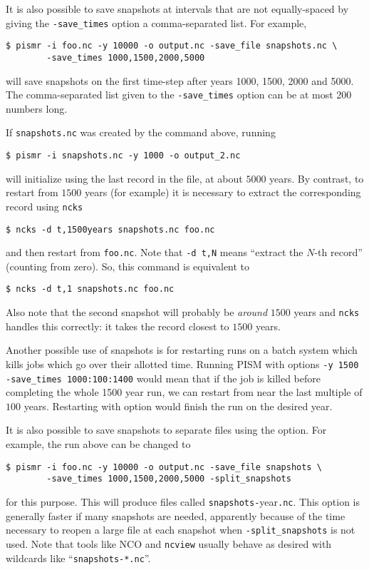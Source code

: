 It is also possible to save snapshots at intervals that are not equally-spaced
by giving the \verb|-save_times| option a comma-separated list. For example,
\begin{verbatim}
$ pismr -i foo.nc -y 10000 -o output.nc -save_file snapshots.nc \
        -save_times 1000,1500,2000,5000
\end{verbatim}
will save snapshots on the first time-step after years 1000, 1500, 2000 and 5000.
The comma-separated list given to the \verb|-save_times| option can be at most 200 numbers long.

If \verb|snapshots.nc| was created by the command above, running
\begin{verbatim}
$ pismr -i snapshots.nc -y 1000 -o output_2.nc
\end{verbatim}
will initialize using the last record in the file, at about $5000$ years.  By contrast, to restart from $1500$ years (for example) it is necessary to extract the corresponding record using \verb|ncks|
\begin{verbatim}
$ ncks -d t,1500years snapshots.nc foo.nc
\end{verbatim}
and then restart from \verb|foo.nc|.  Note that \verb|-d t,N| means ``extract the $N$-th record'' (counting from zero).  So, this command is equivalent to
\begin{verbatim}
$ ncks -d t,1 snapshots.nc foo.nc
\end{verbatim}
Also note that the second snapshot will probably be \emph{around} $1500$ years and \verb|ncks| handles this correctly: it takes the record closest to $1500$ years.

Another possible use of snapshots is for restarting runs on a batch system which kills jobs which go over their allotted time.  Running PISM with options \verb|-y 1500| \verb|-save_times 1000:100:1400| would mean that if the job is killed before completing the whole 1500 year run, we can restart from near the last multiple of $100$ years.  Restarting with option  would finish the run on the desired year.

It is also possible to save snapshots to separate files using the
\intextoption{split\und snapshots} option.  For example, the run above can be changed to
\begin{verbatim}
$ pismr -i foo.nc -y 10000 -o output.nc -save_file snapshots \
        -save_times 1000,1500,2000,5000 -split_snapshots
\end{verbatim}
for this purpose.  This will produce files called \verb|snapshots-|year\verb|.nc|.  This option is generally faster if many snapshots are needed, apparently because of the time necessary to reopen a large file at each snapshot when \verb|-split_snapshots| is not used.  Note that tools like NCO and \verb|ncview| usually behave as desired with wildcards like ``\verb|snapshots-*.nc|''.

